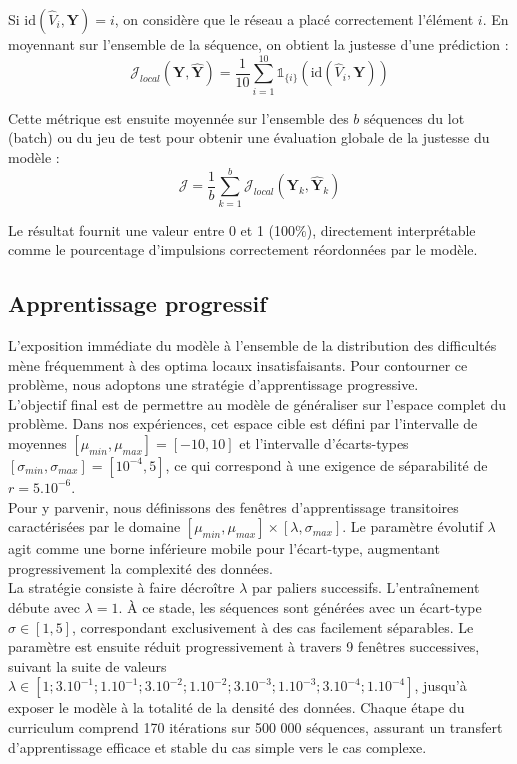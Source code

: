 Si $\mathrm{id}(\hat{V}_i, \mathbf{Y}) = i$, on considère que le réseau a placé correctement l'élément $i$. En moyennant sur l'ensemble de la séquence, on obtient la justesse d'une prédiction :
\begin{equation} 
\label{just}
\mathcal{J}_{local}(\mathbf{Y}, \hat{\mathbf{Y}}) = \frac{1}{10} \sum_{i=1}^{10}\mathds{1}_{ \{ i \} }(\mathrm{id}(\hat{V}_i, \mathbf{Y}) )
\end{equation}
 
Cette métrique est ensuite moyennée sur l'ensemble des $b$ séquences du lot (batch) ou du jeu de test pour obtenir une évaluation globale de la justesse du modèle :
\begin{equation}
\mathcal{J} = \frac{1}{b} \sum_{k=1}^{b} \mathcal{J}_{local}(\mathbf{Y}_k, \hat{\mathbf{Y}}_k)
\end{equation}

Le résultat fournit une valeur entre 0 et 1 (100\%), directement interprétable comme le pourcentage d'impulsions correctement réordonnées par le modèle.

\subsection{Apprentissage progressif}
L'exposition immédiate du modèle à l'ensemble de la distribution des difficultés mène fréquemment à des optima locaux insatisfaisants. Pour contourner ce problème, nous adoptons une stratégie d'apprentissage progressive.\\

L'objectif final est de permettre au modèle de généraliser sur l'espace complet du problème. Dans nos expériences, cet espace cible est défini par l'intervalle de moyennes $[\mu_{min}, \mu_{max}] = [-10, 10]$ et l'intervalle d'écarts-types $[\sigma_{min}, \sigma_{max}] = [10^{-4}, 5]$, ce qui correspond à une exigence de séparabilité de $r = 5.10^{-6}$.\\

Pour y parvenir, nous définissons des fenêtres d'apprentissage transitoires caractérisées par le domaine $[\mu_{min}, \mu_{max}] \times [\lambda, \sigma_{max}]$. Le paramètre évolutif $\lambda$ agit comme une borne inférieure mobile pour l'écart-type, augmentant progressivement la complexité des données.\\

La stratégie consiste à faire décroître $\lambda$ par paliers successifs. L'entraînement débute avec $\lambda=1$. À ce stade, les séquences sont générées avec un écart-type $\sigma \in [1, 5]$, correspondant exclusivement à des cas facilement séparables. Le paramètre est ensuite réduit progressivement à travers 9 fenêtres successives, suivant la suite de valeurs $\lambda \in [1; 3.10^{-1}; 1.10^{-1};3.10^{-2};1.10^{-2};3.10^{-3};1.10^{-3};3.10^{-4};1.10^{-4}]$, jusqu'à exposer le modèle à la totalité de la densité des données. Chaque étape du curriculum comprend 170 itérations sur 500 000 séquences, assurant un transfert d'apprentissage efficace et stable du cas simple vers le cas complexe.

